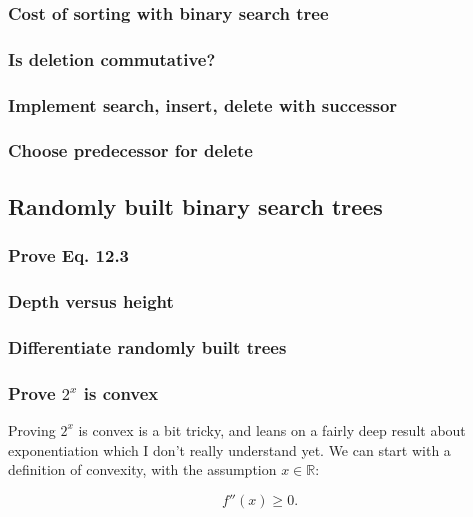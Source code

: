\documentclass{article}
\begin{document}
\subsubsection{Cost of sorting with binary search tree}

\subsubsection{Is deletion commutative?}

\subsubsection{Implement search, insert, delete with successor}

\subsubsection{Choose predecessor for delete}


\subsection{Randomly built binary search trees}

\subsubsection{Prove Eq. 12.3}

\subsubsection{Depth versus height}

\subsubsection{Differentiate randomly built trees}


\subsubsection{Prove $2^x$ is convex}

Proving $2^x$ is convex is a bit tricky, and leans on a fairly deep result about
exponentiation which I don't really understand yet. We can start with a definition
of convexity, with the assumption $x\in\mathbb{R}$:

\begin{equation}
  f''(x) \geq 0.
\end{equation}
\end{document}
